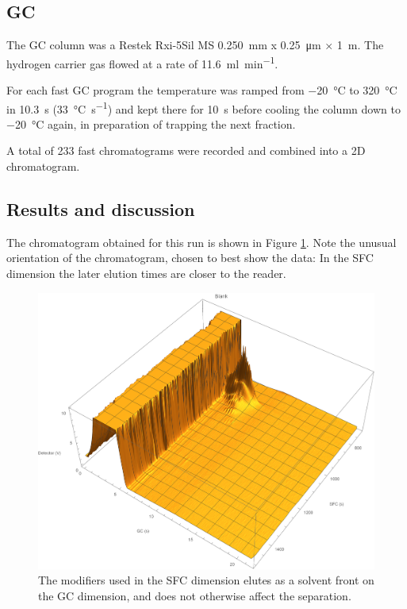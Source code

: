\subsection{GC}

The GC column was a Restek Rxi-5Sil MS \SI{0.250}{\milli\metre} x
\SI{0.25}{\micro\meter} × \SI{1}{\metre}. The hydrogen carrier gas flowed at a
rate of \SI{11.6}{\milli\litre\per\minute}.

For each fast GC program the temperature was ramped from \SI{-20}{\celsius} to
\SI{320}{\celsius} in \SI{10.3}{\second} (\SI{33}{\celsius\per\second}) and kept
there for \SI{10}{\second} before cooling the column down to \SI{-20}{\celsius}
again, in preparation of trapping the next fraction.

A total of 233 fast chromatograms were recorded and combined into a 2D
chromatogram.

\subsection{Results and discussion}

The chromatogram obtained for this run is shown in Figure \ref{fig:Modifier}.
Note the unusual orientation of the chromatogram, chosen to best show the data:
In the SFC dimension the later elution times are closer to the reader.

\begin{figure}
	\centering
	\includegraphics[width=\textwidth]{Figures/Modifier.pdf}
	\decoRule	
	
	\caption[Modifiers in SFC]{The modifiers used in the SFC dimension elutes as a
solvent front on the GC dimension, and does not otherwise affect the separation.}
	
	\label{fig:Modifier} 
\end{figure}

